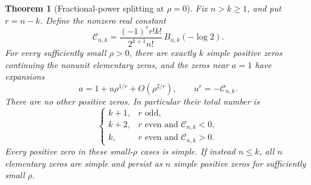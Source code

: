 \documentclass[11pt,letterpaper]{article}
\numberwithin{equation}{section}
\newtheorem{theorem}{Theorem}[section]
\theoremstyle{definition}\newtheorem{definition}[theorem]{Definition}
\theoremstyle{remark}\newtheorem{remark}[theorem]{Remark}
\begin{document}
\begin{theorem}[Fractional-power splitting at $\rho=0$]\label{thm:weak}
Fix $n>k\ge1$, and put $r=n-k$. Define the nonzero real constant
\begin{equation}\label{eq:splitC}
 \mathcal C_{n,k}=
 \frac{(-1)^r r!k!}{2^{k+1}n!}\,B_{n,k}(-\log2).
\end{equation}
For every sufficiently small $\rho>0$, there are exactly $k$ simple positive zeros continuing the nonunit elementary zeros, and the zeros near $a=1$ have expansions
\begin{equation}\label{eq:puiseux}
 a=1+u\rho^{1/r}+O(\rho^{2/r}),\qquad u^r=-\mathcal C_{n,k}.
\end{equation}
There are no other positive zeros. In particular their total number is
\begin{equation}\label{eq:weak-count}
 \begin{cases}
 k+1,&r\text{ odd},\\
 k+2,&r\text{ even and }\mathcal C_{n,k}<0,\\
 k,&r\text{ even and }\mathcal C_{n,k}>0.
 \end{cases}
\end{equation}
Every positive zero in these small-$\rho$ cases is simple. If instead $n\le k$, all $n$ elementary zeros are simple and persist as $n$ simple positive zeros for sufficiently small $\rho$.
\end{theorem}
\end{document}
